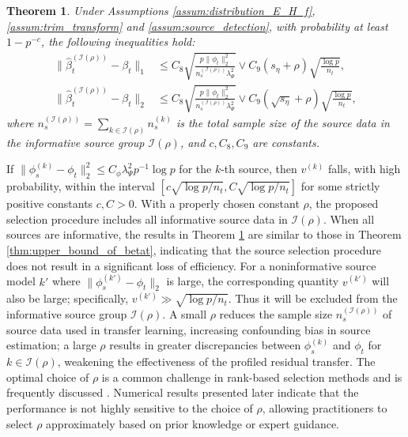 \documentclass[12pt]{article}
\newtheorem{thm}{Theorem}
\begin{document}
\begin{thm}
\label{thm:source_selection}
    Under Assumptions \ref{assum:distribution_E_H_f}, \ref{assum:trim_transform} and \ref{assum:source_detection}, with probability at least $1-p^{-c}$, the following inequalities hold:
    \begin{align*}
        \|\hat{\beta}_t^{(\mathcal{I}(\rho))}  - \beta_t\|_1 &\le C_8\sqrt{\frac{p\|\phi_t\|_2^2 }{n_s^{(\mathcal{I}(\rho))}\lambda_\Psi^2}}\vee C_9 (s_\eta +\rho)\sqrt{\frac{\log p}{n_t}},\\
        \|\hat{\beta}_t^{(\mathcal{I}(\rho))}  - \beta_t\|_2 &\le C_8\sqrt{\frac{p\|\phi_t\|_2^2 }{n_s^{(\mathcal{I}(\rho))}\lambda_\Psi^2}}\vee C_9 (\sqrt{s_\eta}+\rho)\sqrt{\frac{\log p}{n_t}},
    \end{align*}
    where $n_s^{(\mathcal{I}(\rho))} = \sum_{k\in \mathcal{I}(\rho)} n_s^{(k)}$ is the total sample size of the source data in the informative source group $\mathcal{I}(\rho)$, and $c,C_8,C_9$ are constants.              
\end{thm}

If $\|\phi_s^{(k)}-\phi_t\|_2^2 \le C_\phi  \lambda_\Psi^2 p^{-1} \log p$ for the $k$-th source, then $v^{(k)}$ falls, with high probability, within the interval $[c\sqrt{\log p/n_t},C\sqrt{\log p/n_t}]$ for some strictly positive constants $c,C>0$. With a properly chosen constant $\rho$, the proposed selection procedure includes all informative source data in $\mathcal{I}(\rho)$. When all sources are informative, the results in Theorem \ref{thm:source_selection} are similar to those in Theorem \ref{thm:upper_bound_of_betat}, indicating that the source selection procedure does not result in a significant loss of efficiency. For a noninformative source model $k'$ where $\|\phi_s^{(k')} -\phi_t\|_2$ is large, the corresponding quantity $v^{(k')}$ will also be large; specifically, $v^{(k')}\gg \sqrt{\log p/n_t}$. Thus it will be excluded from the informative source group $\mathcal{I}(\rho)$. %
A small $\rho$ reduces the sample size $n_s^{(\mathcal{I}(\rho))}$ of source data used in transfer learning, increasing confounding bias in source estimation; a large $\rho$ results in greater discrepancies between $\phi_s^{(k)}$ and $\phi_t$ for $k \in \mathcal{I}(\rho)$, weakening the effectiveness of the profiled residual transfer. The optimal choice of $\rho$ is a common challenge in rank-based selection methods and is frequently discussed \citep{baranowski2020ranking,malhotra2021threshold}. Numerical results presented later indicate that the performance is not highly sensitive to the choice of $\rho$, allowing practitioners to select $\rho$ approximately based on prior knowledge or expert guidance.
\end{document}
